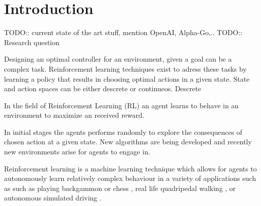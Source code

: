 
\section{Introduction}
TODO:: current state of the art stuff, mention OpenAI, Alpha-Go,..
TODO:: Research question


Designing an optimal controller for an environment, given a goal can be a complex task. Reinforcement learning techniques exist to adress these tasks by learning a policy that results in choosing optimal actions in a given state. State and action spaces can be either descrete or continueos. Descrete 


In the field of Reinforcement Learning (RL) an agent learns to behave in an environment to maximize an received reward.


In initial stages the agents performs randomly to explore the consequences of chosen action at a given state.
New algorithms are being developed and recently new environments arise for agents to engage in. 

Reinforcement learning is a machine learning technique which allows for agents to autonomously learn relatively complex behaviour
in a variety of applications such as such as playing backgammon \cite{tesauro2002programming} or chess \cite{baxter1999knightcap},
real life quadripedal walking \cite{kohl2004policy}, or autonomous simulated driving \cite{}. \\

